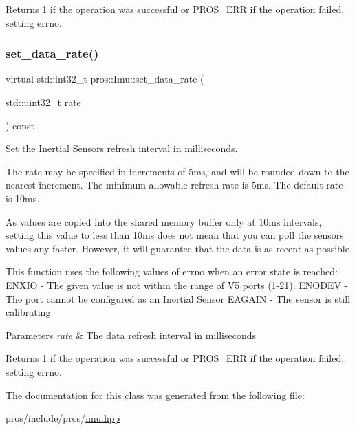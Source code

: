 \begin{DoxyReturn}{Returns}
1 if the operation was successful or P\+R\+O\+S\+\_\+\+E\+RR if the operation failed, setting errno. 
\end{DoxyReturn}
\mbox{\label{classpros_1_1Imu_adb0b63f2de5f41b664fff4a60a808ba5}} 
\subsubsection{\texorpdfstring{set\+\_\+data\+\_\+rate()}{set\_data\_rate()}}
{\footnotesize\ttfamily virtual std\+::int32\+\_\+t pros\+::\+Imu\+::set\+\_\+data\+\_\+rate (\begin{DoxyParamCaption}\item[{std\+::uint32\+\_\+t}]{rate }\end{DoxyParamCaption}) const\hspace{0.3cm}{\ttfamily [virtual]}}

Set the Inertial Sensor\textquotesingle{}s refresh interval in milliseconds.

The rate may be specified in increments of 5ms, and will be rounded down to the nearest increment. The minimum allowable refresh rate is 5ms. The default rate is 10ms.

As values are copied into the shared memory buffer only at 10ms intervals, setting this value to less than 10ms does not mean that you can poll the sensor\textquotesingle{}s values any faster. However, it will guarantee that the data is as recent as possible.

This function uses the following values of errno when an error state is reached\+: E\+N\+X\+IO -\/ The given value is not within the range of V5 ports (1-\/21). E\+N\+O\+D\+EV -\/ The port cannot be configured as an Inertial Sensor E\+A\+G\+A\+IN -\/ The sensor is still calibrating


\begin{DoxyParams}{Parameters}
{\em rate} & The data refresh interval in milliseconds \\
\hline
\end{DoxyParams}
\begin{DoxyReturn}{Returns}
1 if the operation was successful or P\+R\+O\+S\+\_\+\+E\+RR if the operation failed, setting errno. 
\end{DoxyReturn}


The documentation for this class was generated from the following file\+:\begin{DoxyCompactItemize}
\item 
pros/include/pros/\hyperlink{imu_8hpp}{imu.\+hpp}\end{DoxyCompactItemize}

